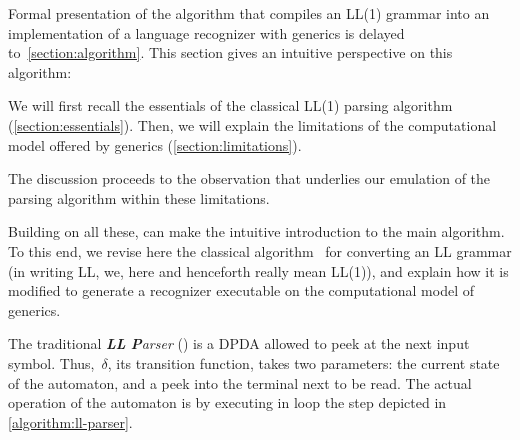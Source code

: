 Formal presentation of the algorithm that compiles an LL(1) grammar into an implementation of a
  language recognizer with \Java generics
  is delayed to~\cref{section:algorithm}.
This section gives an intuitive perspective on this algorithm:

We will first recall the essentials of the classical LL(1) parsing algorithm (\cref{section:essentials}).
Then, we will explain the limitations of the computational model
  offered by \Java generics (\cref{section:limitations}).

The discussion proceeds to the observation
  that underlies our emulation of the parsing algorithm
  within these limitations.

Building on all these,  can
make the intuitive introduction to the main algorithm.
To this end, we revise here the classical
algorithm~\cite{Lewis:66} for converting an LL grammar
(in writing LL, we, here and henceforth really mean
LL(1)), and explain how it is modified to generate a
recognizer executable on the computational model of
\Java generics.

\label{section:essentials}
The traditional \emph{\textbf{LL} \textbf Parser} (\LLp)
  is a DPDA allowed to peek at the next input symbol.
Thus,~$δ$, its transition function, takes two parameters: the current
  state of the automaton, and a peek into the terminal next to be read.
The actual operation of the automaton is by executing in loop the step
  depicted in \cref{algorithm:ll-parser}.

